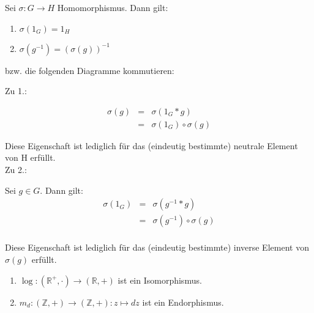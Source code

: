 \documentclass[10pt]{scrbook}
\begin{document}
\begin{Le}
Sei $\sigma: G\rightarrow H$ Homomorphismus. Dann gilt:
\begin{enumerate}
	\item $\sigma(1_G)=1_H$
	\item $\sigma(g^{-1})=(\sigma(g))^{-1}$
\end{enumerate}
bzw. die folgenden Diagramme kommutieren:

\begin{xy}
\end{xy}

\begin{xy}
\end{xy}
\end{Le}
\begin{bew}
Zu 1.:

\begin{eqnarray}
	\sigma(g) & = & \sigma(1_G*g)\\
	& = & \sigma(1_G)\circ\sigma(g)
	\label{eq:hom_1}
\end{eqnarray}

Diese Eigenschaft ist lediglich für das (eindeutig bestimmte) neutrale Element von H erfüllt.\\

Zu 2.:

Sei $g\in G$. Dann gilt:
\begin{eqnarray}
  \sigma(1_G) & = & \sigma(g^{-1}*g) \\
	& = & \sigma(g^{-1})\circ\sigma(g) \\
	\label{eq:hom_2}
\end{eqnarray}

Diese Eigenschaft ist lediglich für das (eindeutig bestimmte) inverse Element von $\sigma(g)$ erfüllt.
\end{bew}

\begin{Bsp}
\begin{enumerate}
	\item $\log: (\mathbb{R}^+, \cdot) \rightarrow (\mathbb{R}, +)$ ist ein Isomorphismus.
	\item $m_d: (\mathbb{Z}, +) \rightarrow (\mathbb{Z}, +): z\mapsto d z$ ist ein Endorphismus.
\end{enumerate}
\end{Bsp}
\end{document}
